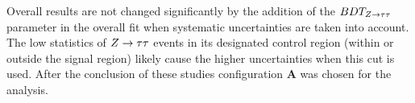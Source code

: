 Overall results are not changed significantly by the addition of the $BDT_{Z\rightarrow\tau\tau}$ parameter in the overall fit when systematic uncertainties are taken into account. The low statistics of $Z\rightarrow\tau\tau$ events in its designated control region (within or outside the signal region) likely cause the higher uncertainties when this cut is used. After the conclusion of these studies configuration \textbf{A} was chosen for the analysis. 

%



